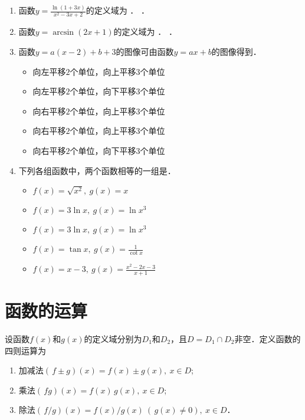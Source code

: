 \begin{enumerate}
\item 函数\(\displaystyle y = \frac{\ln(1+3x)}{x^2-3x+2}\)的定义域为
  \ifshowsol
  \uline{}．
  \else
  \uline{\makebox[13em]{}}．
  \fi

\item 函数\(y = \arcsin(2x+1)\)的定义域为
  \ifshowsol
  \uline{}．
  \else
  \uline{\makebox[9em]{}}．
  \fi

\item 函数\(y = a(x-2) + b + 3\)的图像可由函数\(y = ax + b\)的图像\uline{\makebox[4em]{}}得到．
  \begin{itemize}
    \renewcommand{\labelitemi}{\faCircleThin}
  \item 向左平移\(2\)个单位，向上平移\(3\)个单位
  \item 向左平移\(2\)个单位，向下平移\(3\)个单位
    \ifshowsol
  \item[\faCircle] 向右平移\(2\)个单位，向上平移\(3\)个单位
    \else
  \item 向右平移\(2\)个单位，向上平移\(3\)个单位
    \fi
  \item 向右平移\(2\)个单位，向下平移\(3\)个单位
  \end{itemize}

\item 下列各组函数中，两个函数相等的一组是\uline{\makebox[4em]{}}．
  \begin{itemize}
    \renewcommand{\labelitemi}{\faCircleThin}
  \item \(f(x) = \sqrt{x^2},\ g(x) = x\)
    \ifshowsol
  \item[\faCircle] \(f(x) = 3\ln x,\ g(x) = \ln x^3\)
    \else
  \item \(f(x) = 3\ln x,\ g(x) = \ln x^3\)
    \fi
  \item \(f(x) = \tan x,\ g(x) = \frac1{\cot x}\)
  \item \(f(x) = x - 3,\ g(x) = \frac{x^2-2x-3}{x+1}\)
  \end{itemize}
\end{enumerate}
\fi

\section{函数的运算\label{sec:funcops}}

\begin{definition}
  \label{defn:func4ops}
  设函数\(f(x)\)和\(g(x)\)的定义域分别为\(D_1\)和\(D_2\)，且\(D = D_1 \cap D_2\)非空．定义函数的四则运算为
  \begin{enumerate}
    \renewcommand{\labelenumi}{\enumparen{\arabic{enumi}}}
  \item 加减法\((\,f \pm g)(x) = f(x) \pm g(x),\ x \in D\);
  \item 乘法\((\,fg)(x) = f(x) \, g(x),\ x \in D\);
  \item 除法\((\,f/g)(x) = f(x) / g(x)\ (\,g(x) \ne 0),\ x \in D\)．
  \end{enumerate}
\end{definition}

